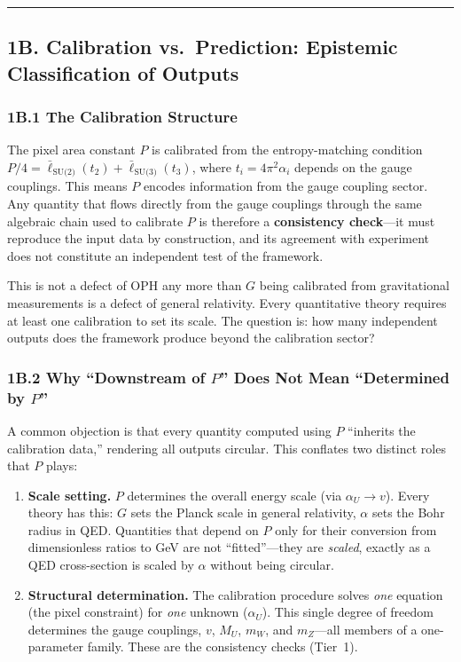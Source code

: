 \begin{center}\rule{0.5\linewidth}{0.5pt}\end{center}

\subsection{1B. Calibration vs.\ Prediction: Epistemic Classification of Outputs}\label{1b-calibration-vs-prediction}

\subsubsection{1B.1 The Calibration Structure}\label{1b1-the-calibration-structure}

The pixel area constant \(P\) is calibrated from the entropy-matching condition \(P/4 = \bar{\ell}_{\text{SU(2)}}(t_2) + \bar{\ell}_{\text{SU(3)}}(t_3)\), where \(t_i = 4\pi^2 \alpha_i\) depends on the gauge couplings. This means \(P\) encodes information from the gauge coupling sector. Any quantity that flows directly from the gauge couplings through the same algebraic chain used to calibrate \(P\) is therefore a \textbf{consistency check}---it must reproduce the input data by construction, and its agreement with experiment does not constitute an independent test of the framework.

This is not a defect of OPH any more than \(G\) being calibrated from gravitational measurements is a defect of general relativity. Every quantitative theory requires at least one calibration to set its scale. The question is: how many independent outputs does the framework produce beyond the calibration sector?

\subsubsection{1B.2 Why ``Downstream of \(P\)'' Does Not Mean ``Determined by \(P\)''}\label{1b2-dimensionless-independence}

A common objection is that every quantity computed using \(P\) ``inherits the calibration data,'' rendering all outputs circular. This conflates two distinct roles that \(P\) plays:

\begin{enumerate}
\item \textbf{Scale setting.} \(P\) determines the overall energy scale (via \(\alpha_U \to v\)). Every theory has this: \(G\) sets the Planck scale in general relativity, \(\alpha\) sets the Bohr radius in QED. Quantities that depend on \(P\) only for their conversion from dimensionless ratios to GeV are not ``fitted''---they are \emph{scaled}, exactly as a QED cross-section is scaled by \(\alpha\) without being circular.
\item \textbf{Structural determination.} The calibration procedure solves \emph{one} equation (the pixel constraint) for \emph{one} unknown (\(\alpha_U\)). This single degree of freedom determines the gauge couplings, \(v\), \(M_U\), \(m_W\), and \(m_Z\)---all members of a one-parameter family. These are the consistency checks (Tier~1).
\end{enumerate}

